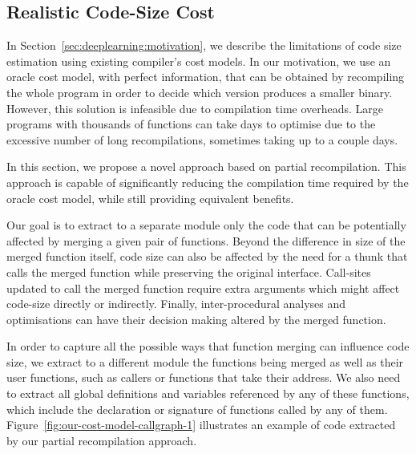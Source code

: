 \subsection{Realistic Code-Size Cost} \label{sec:recompilation-mechanism}

In Section~\ref{sec:deeplearning:motivation}, we describe the limitations of code size estimation using existing compiler's cost models.
In our motivation, we use an oracle cost model, with perfect information, that can be obtained by recompiling the whole program in order to decide which version produces a smaller binary.
However, this solution is infeasible due to compilation time overheads.
Large programs with thousands of functions can take days to optimise due to the excessive number of long recompilations, sometimes taking up to a couple days.

In this section, we propose a novel approach based on partial recompilation.
This approach is capable of significantly reducing the compilation time required by the oracle cost model, while still providing equivalent benefits.

Our goal is to extract to a separate module only the code that can be potentially affected by merging a given pair of functions.
Beyond the difference in size of the merged function itself, code size can also be affected by the need for a thunk that calls the merged function while preserving the original interface.
Call-sites updated to call the merged function require extra arguments which might affect code-size directly or indirectly. %
Finally, inter-procedural analyses and optimisations can have their decision making altered by the merged function.

In order to capture all the possible ways that function merging can influence code size, we extract to a different module the functions being merged as well as their user functions, such as callers or functions that take their address.
We also need to extract all global definitions and variables referenced by any of these functions, which include the declaration or signature of functions called by any of them.
Figure~\ref{fig:our-cost-model-callgraph-1} illustrates an example of code extracted by our partial recompilation approach.

